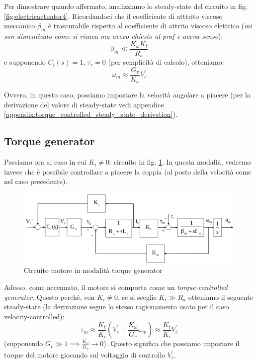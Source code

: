 Per dimostrare quando affermato, analizziamo lo steady-state del circuito in fig. \ref{fig:electricactuator4}. Ricordandoci che il coefficiente di atttrito viscoso meccanico $\beta_m$ è trascurabile rispetto al coefficiente di attrito viscoso elettrico (\textit{mi son dimenticato come si ricava ma avevo chiesto al prof e aveva senso}):
$$
\beta_m \ll \frac{K_\omega K_t}{R_a}
$$
e supponendo $C_i(s) = 1$, $\tau_r = 0$ (per semplicità di calcolo), otteniamo:
$$
\omega_m \approx \frac{G_v}{K_\omega}V^{'}_c
$$

Ovvero, in questo caso, possiamo impostare la velocità angolare a piacere (per la derivazione del valore di steady-state vedi appendice \ref{appendix:torque_controlled_steady_state_derivation}).





\subsection{Torque generator}\label{section:torque_generator}

Passiamo ora al caso in cui $K_i \neq 0$: circuito in fig. \ref{fig:electricactuator3}. In questa modalià, vedremo invece che è possibile controllare a piacere la coppia (al posto della velocità come nel caso precedente).

\begin{figure}[!th]
	\centering
	\includegraphics[width=0.7\linewidth]{images/electric_actuator_3}
	\caption{Circuito motore in modalità torque generator}
	\label{fig:electricactuator3}
\end{figure}

Adesso, come accennato, il motore si comporta come un \textit{torque-controlled generator}. Questo perchè, con $K_i \neq 0$, se si sceglie $K_i \gg R_a$ otteniamo il seguente steady-state (la derivazione segue lo stesso ragionamento usato per il caso velocity-controlled):
$$
\tau_m \approx \frac{K_t}{K_i}(V^{'}_c - \frac{K_\omega}{G_v}\omega_m)
\approx
\frac{K_t}{K_i}V^{'}_c
$$
(supponendo $G_v \gg 1 \implies \frac{K_\omega}{G_v} \to 0$). Questo significa che possiamo impostare il torque del motore giocando sul voltaggio di controllo $V^{'}_c$.





